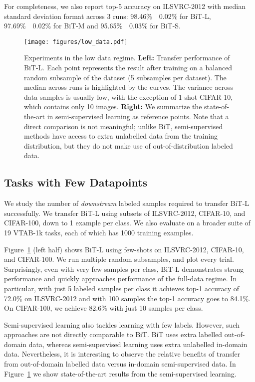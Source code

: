 \documentclass[runningheads]{llncs}
\newcommand{\name}{{BiT}}
\newcommand{\imagenet}{{ILSVRC-2012}}
\begin{document}
For completeness, we also report top-5 accuracy on \imagenet{} with median  standard deviation format across 3 runs: 98.46\%~~0.02\% for \name{}-L, 97.69\%~~0.02\% for \name{}-M and 95.65\%~~0.03\% for \name{}-S. 


\begin{figure}[t]
\centering
\texttt{[image: figures/low\_data.pdf]}
\caption{
Experiments in the low data regime.
\textbf{Left:} Transfer performance of \name{}-L.
Each point represents the result after training on a balanced random subsample of the dataset (5 subsamples per dataset).
The median across runs is highlighted by the curves.
The variance across data samples is usually low, with the exception of 1-shot CIFAR-10, which contains only 10 images.
\textbf{Right:}
We summarize the state-of-the-art in semi-supervised learning as reference points.
Note that a direct comparison is not meaningful; 
unlike \name{}, semi-supervised methods have access to extra unlabelled data from the training distribution, but they do not make use of out-of-distribution labeled data.
}
\label{fig:low_data_plot}
\end{figure}



\subsection{Tasks with Few Datapoints}
We study the number of \emph{downstream} labeled samples required to transfer \name{}-L successfully.
We transfer \name{}-L using subsets of \imagenet{}, CIFAR-10, and CIFAR-100, down to 1 example per class.
We also evaluate on a broader suite of 19 VTAB-1k tasks, each of which has 1000 training examples.

Figure~\ref{fig:low_data_plot} (left half) shows \name{}-L using few-shots on \imagenet{}, CIFAR-10, and CIFAR-100. 
We run multiple random subsamples, and plot every trial.
Surprisingly, even with very few samples per class, \name{}-L demonstrates strong performance and quickly approaches performance of the full-data regime.
In particular, with just 5 labeled samples per class it achieves top-1 accuracy of 72.0\% on \imagenet{} and with 100 samples the top-1 accuracy goes to 84.1\%.
On CIFAR-100, we achieve 82.6\% with just 10 samples per class.

Semi-supervised learning also tackles learning with few labels.
However, such approaches are not directly comparable to \name{}.
\name{} uses extra labelled out-of-domain data, whereas semi-supervised learning uses extra unlabelled in-domain data.
Nevertheless, it is interesting to observe the relative benefits of transfer from out-of-domain labelled data versus in-domain semi-supervised data.
In Figure~\ref{fig:low_data_plot} we show state-of-the-art results from the semi-supervised learning. 
\end{document}
